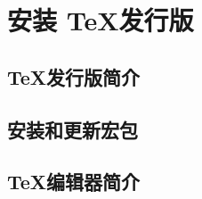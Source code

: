 \chapter{安装 \protect\TeX 发行版}\label{app:install}

\leavevmode\nobreakspace

\section{\protect\TeX 发行版简介}

\leavevmode\nobreakspace

\section{安装和更新宏包}

\leavevmode\nobreakspace

\section{\protect\TeX 编辑器简介}

\leavevmode\nobreakspace

\endinput